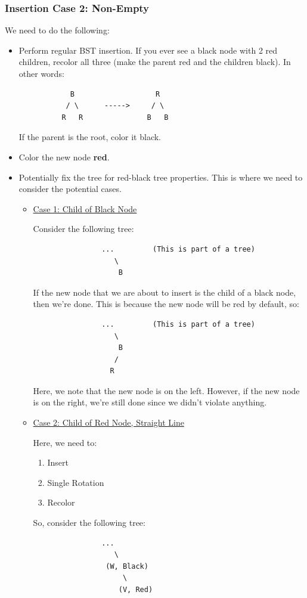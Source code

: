\documentclass[letterpaper]{article}
\begin{document}
\subsubsection{Insertion Case 2: Non-Empty}
We need to do the following: 
\begin{itemize}
    \item Perform regular BST insertion. If you ever see a black node with 2 red children, recolor all three (make the parent red and the children black). In other words: 
    \begin{verbatim}
            B                   R
           / \      ----->     / \ 
          R   R               B   B
    \end{verbatim}
    If the parent is the root, color it black. 

    \item Color the new node \textbf{red}. 
    
    \item Potentially fix the tree for red-black tree properties. This is where we need to consider the potential cases.
    
    \begin{itemize}
        \item \underline{Case 1: Child of Black Node}
        
        Consider the following tree: 
        \begin{verbatim}
                ...         (This is part of a tree)
                   \ 
                    B
        \end{verbatim}
        If the new node that we are about to insert is the child of a black node, then we're done. This is because the new node will be red by default, so: 
        \begin{verbatim}
                ...         (This is part of a tree)
                   \ 
                    B
                   /
                  R
        \end{verbatim}
        Here, we note that the new node is on the left. However, if the new node is on the right, we're still done since we didn't violate anything. 

        \item \underline{Case 2: Child of Red Node, Straight Line}

        Here, we need to: 
        \begin{enumerate}
            \item Insert 
            \item Single Rotation 
            \item Recolor 
        \end{enumerate}
        So, consider the following tree: 
        \begin{verbatim}
                ... 
                   \ 
                 (W, Black)
                     \ 
                    (V, Red)
        \end{verbatim}


\end{itemize}
\end{itemize}
\end{document}
